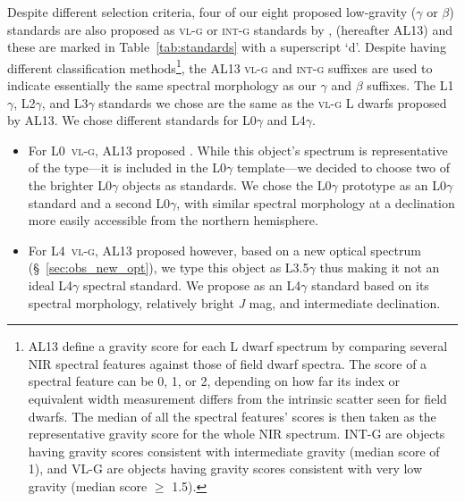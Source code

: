 \documentclass[modern,trackchanges]{aastex61}
\begin{document}
Despite different selection criteria, four of our eight proposed low-gravity ($\gamma$ or $\beta$) standards are also proposed as \textsc{vl-g} or \textsc{int-g} standards by \citet{Allers:2013hk}, (hereafter AL13) and these are marked in Table~\ref{tab:standards} with a superscript `d'.
Despite having different classification methods\footnote{AL13 define a gravity score for each L dwarf spectrum by comparing several NIR spectral features against those of field dwarf spectra. The score of a spectral feature can be 0, 1, or 2, depending on how far its index or equivalent width measurement differs from the intrinsic scatter seen for field dwarfs. The median of all the spectral features' scores is then taken as the representative gravity score for the whole NIR spectrum. INT-G are objects having gravity scores consistent with intermediate gravity (median score of 1), and VL-G are objects having gravity scores consistent with very low gravity (median score $\geq$ 1.5).}, the AL13 \textsc{vl-g} and \textsc{int-g} suffixes are used to indicate essentially the same spectral morphology as our $\gamma$ and $\beta$ suffixes.
The L1$\gamma$, L2$\gamma$, and L3$\gamma$ standards we chose are the same as the \textsc{vl-g} L dwarfs proposed by AL13.
We chose different standards for L0$\gamma$ and L4$\gamma$.
\begin{itemize}

  \item For L0~\textsc{vl-g}, AL13 proposed . While this object's spectrum is representative of the type---it is included in the L0$\gamma$ template---we decided to choose two of the brighter L0$\gamma$ objects as standards. We chose the L0$\gamma$ prototype  as an L0$\gamma$ standard and a second L0$\gamma$,  with similar spectral morphology at a declination more easily accessible from the northern hemisphere.

  \item For L4~\textsc{vl-g}, AL13 proposed  however, based on a new optical spectrum (\S~\ref{sec:obs_new_opt}), we type this object as L3.5$\gamma$ thus making it not an ideal L4$\gamma$ spectral standard.
  We propose  as an L4$\gamma$ standard based on its spectral morphology, relatively bright \emph{J} mag, and intermediate declination.

\end{itemize}
\end{document}
